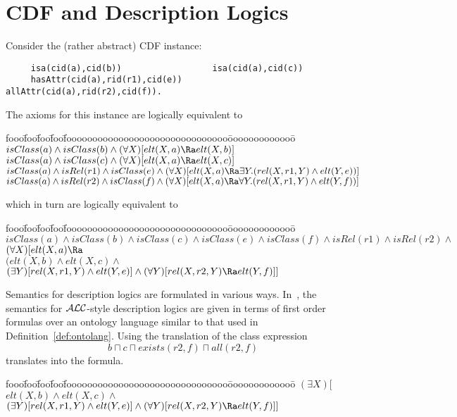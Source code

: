 \section{CDF and Description Logics}
\label{sec:comp} 

\begin{example} \rm \label{ex:classexpr}
Consider the (rather abstract) CDF instance: 
\begin{verbatim}
     isa(cid(a),cid(b))                  isa(cid(a),cid(c))
     hasAttr(cid(a),rid(r1),cid(e))      allAttr(cid(a),rid(r2),cid(f)).
\end{verbatim}
The axioms for this instance are logically equivalent to 
\begin{tabbing}
fooo\=foo\=foo\=foo\=fooooooooooooooooooooooooooooooo\=ooooooooooooo\=\kill
\> $isClass(a) \wedge isClass(b) \wedge 
	(\forall X)[elt(X,a) \Ra elt(X,b)] $ \\
\> $isClass(a) \wedge isClass(c) \wedge 
	(\forall X)[elt(X,a) \Ra elt(X,c)] $ \\	
\> $isClass(a) \wedge isRel(r1) \wedge isClass(e) \wedge 
     (\forall X)[elt(X,a) \Ra \exists Y.(rel(X,r1,Y) \wedge elt(Y,e))]$ \\
\> $isClass(a) \wedge isRel(r2) \wedge isClass(f) \wedge 
     (\forall X)[elt(X,a) \Ra \forall Y.(rel(X,r1,Y) \wedge elt(Y,f))]$ 
\end{tabbing}
which in turn are logically equivalent to
\begin{tabbing}
fooo\=foo\=foo\=foo\=fooooooooooooooooooooooooooooooo\=ooooooooooooo\=\kill
$isClass(a) \wedge isClass(b) \wedge isClass(c) \wedge isClass(e) 
	\wedge isClass(f) \wedge isRel(r1) \wedge isRel(r2)  \wedge $ \\
$(\forall X)[elt(X,a) \Ra$ \\
\> \> $(elt(X,b) \wedge  elt(X,c) \wedge$ \\
\> \> $(\exists Y)[rel(X,r1,Y) \wedge elt(Y,e)] \wedge
      (\forall Y)[rel(X,r2,Y) \Ra elt(Y,f)]]$ 
\end{tabbing}
Semantics for description logics are formulated in various ways.
In~\cite{Swif04}, the semantics for ${\cal ALC}$-style description
logics are given in terms of first order formulas over an ontology
language similar to that used in Definition~\ref{def:ontolang}.  Using
the translation of \cite{Swif04} the class expression
\[ b \sqcap c \sqcap exists(r2,f) \sqcap all(r2,f) \]
translates into the formula.
\begin{tabbing}
fooo\=foo\=foo\=foo\=fooooooooooooooooooooooooooooooo\=ooooooooooooo\=\kill
\>  $(\exists X)[ $ 
$ elt(X,b) \wedge elt(X,c)  \wedge $ \\
\> \> $(\exists Y)[rel(X,r1,Y) \wedge elt (Y,e)] \wedge 
       (\forall Y)[rel(X,r2,Y) \Ra elt(Y,f)]]$
\end{tabbing}
\end{example}

